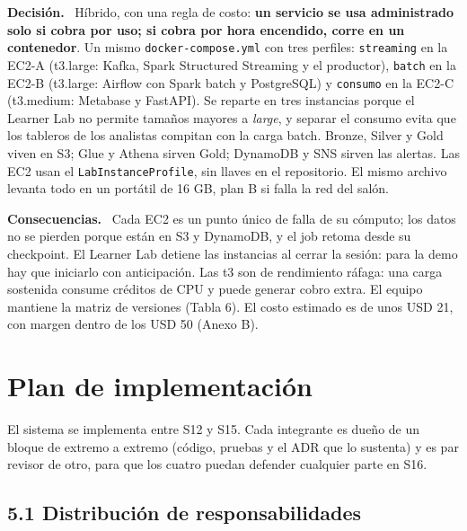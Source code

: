 \documentclass[12pt,letterpaper]{article}
\newcommand{\code}[1]{{\small\texttt{#1}}}
\newcommand{\adrpart}[1]{\textbf{#1.}~}
\begin{document}
\adrpart{Decisión} Híbrido, con una regla de costo: \textbf{un servicio se usa administrado solo si cobra por uso; si cobra por hora encendido, corre en un contenedor}. Un mismo \code{docker-compose.yml} con tres perfiles: \code{streaming} en la EC2-A (t3.large: Kafka, Spark Structured Streaming y el productor), \code{batch} en la EC2-B (t3.large: Airflow con Spark batch y PostgreSQL) y \code{consumo} en la EC2-C (t3.medium: Metabase y FastAPI). Se reparte en tres instancias porque el Learner Lab no permite tamaños mayores a \emph{large}, y separar el consumo evita que los tableros de los analistas compitan con la carga batch. Bronze, Silver y Gold viven en S3; Glue y Athena sirven Gold; DynamoDB y SNS sirven las alertas. Las EC2 usan el \code{LabInstanceProfile}, sin llaves en el repositorio. El mismo archivo levanta todo en un portátil de 16 GB, plan B si falla la red del salón.

\adrpart{Consecuencias} Cada EC2 es un punto único de falla de su cómputo; los datos no se pierden porque están en S3 y DynamoDB, y el job retoma desde su checkpoint. El Learner Lab detiene las instancias al cerrar la sesión: para la demo hay que iniciarlo con anticipación. Las t3 son de rendimiento ráfaga: una carga sostenida consume créditos de CPU y puede generar cobro extra. El equipo mantiene la matriz de versiones (Tabla 6). El costo estimado es de unos USD 21, con margen dentro de los USD 50 (Anexo B).

\section{Plan de implementación}

El sistema se implementa entre S12 y S15. Cada integrante es dueño de un bloque de extremo a extremo (código, pruebas y el ADR que lo sustenta) y es par revisor de otro, para que los cuatro puedan defender cualquier parte en S16.

\subsection*{5.1 Distribución de responsabilidades}
\end{document}
